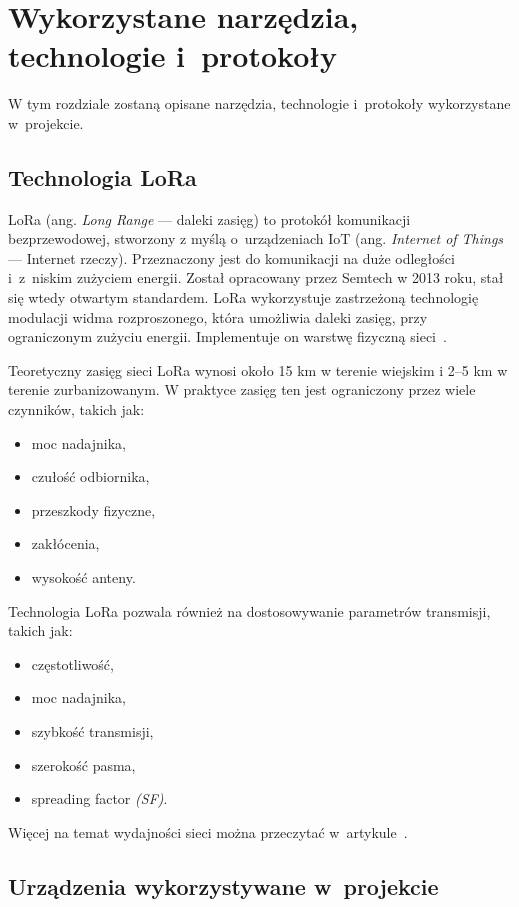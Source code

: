 
\chapter{Wykorzystane narzędzia, technologie i~protokoły}
W tym rozdziale zostaną opisane narzędzia, technologie i~protokoły wykorzystane w~projekcie.
\section{Technologia LoRa}
LoRa (ang. \emph{Long Range} — daleki zasięg) to protokół komunikacji bezprzewodowej, stworzony z myślą o~urządzeniach IoT (ang. \emph{Internet of Things} — Internet rzeczy).
Przeznaczony jest do komunikacji na duże odległości i~z~niskim zużyciem energii.
Został opracowany przez Semtech w 2013 roku, stał się wtedy otwartym standardem.
LoRa wykorzystuje zastrzeżoną technologię modulacji widma rozproszonego, która umożliwia daleki zasięg, przy ograniczonym zużyciu energii.
Implementuje on warstwę fizyczną sieci~\cite{lora:about}.

Teoretyczny zasięg sieci LoRa wynosi około 15 km w terenie wiejskim i 2--5 km w terenie zurbanizowanym.
W praktyce zasięg ten jest ograniczony przez wiele czynników, takich jak:
\begin{itemize}
    \item moc nadajnika,
    \item czułość odbiornika,
    \item przeszkody fizyczne,
    \item zakłócenia,
    \item wysokość anteny.
\end{itemize}

Technologia LoRa pozwala również na dostosowywanie parametrów transmisji, takich jak:
\begin{itemize}
    \item częstotliwość,
    \item moc nadajnika,
    \item szybkość transmisji,
    \item szerokość pasma,
    \item spreading factor \emph{(SF)}.
\end{itemize}
Więcej na temat wydajności sieci można przeczytać w~artykule~\cite{bib:lora-performance}.

\section{Urządzenia wykorzystywane w~projekcie}

